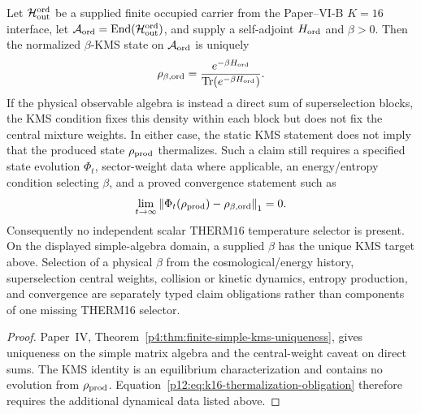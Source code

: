 \documentclass[12pt,a4paper]{article}
\begin{document}
\begin{corollary}
\label{p12:cor:k16-finite-kms-target-versus-thermalization}
Let \(\mathcal H_{\rm out}^{\rm ord}\) be a supplied finite occupied carrier
from the Paper--VI-B \(K=16\) interface, let
\(\mathcal A_{\rm ord}=\operatorname{End}(\mathcal H_{\rm out}^{\rm ord})\), and supply a
self-adjoint \(H_{\rm ord}\) and \(\beta>0\).  Then the normalized
\(\beta\)-KMS state on \(\mathcal A_{\rm ord}\) is uniquely
\begin{equation}
\label{p12:eq:k16-unique-finite-kms-target}
 \rho_{\beta,\rm ord}
 =\frac{e^{-\beta H_{\rm ord}}}
        {\operatorname{Tr}(e^{-\beta H_{\rm ord}})}.
\end{equation}
If the physical observable algebra is instead a direct sum of superselection
blocks, the KMS condition fixes this density within each block but does not
fix the central mixture weights.  In either case, the static KMS statement
does not imply that the produced state \(\rho_{\rm prod}\) thermalizes.  Such a
claim still requires a specified state evolution \(\Phi_t\), sector-weight
data where applicable, an energy/entropy condition selecting \(\beta\), and a
proved convergence statement such as
\begin{equation}
\label{p12:eq:k16-thermalization-obligation}
 \lim_{t\to\infty}
 \left\|\Phi_t(\rho_{\rm prod})-\rho_{\beta,\rm ord}\right\|_1=0.
\end{equation}
Consequently no independent scalar \(\mathrm{THERM16}\) temperature selector
is present.  On the displayed simple-algebra domain, a supplied \(\beta\) has
the unique KMS target above.  Selection of a physical \(\beta\) from the
cosmological/energy history, superselection central weights, collision or
kinetic dynamics, entropy production, and convergence are separately typed
claim obligations rather than components of one missing THERM16 selector.
\end{corollary}

\begin{proof}
Paper~IV, Theorem~\ref{p4:thm:finite-simple-kms-uniqueness}, gives uniqueness
on the simple matrix algebra and the central-weight caveat on direct sums.
The KMS identity is an equilibrium characterization and contains no evolution
from \(\rho_{\rm prod}\).  Equation~\eqref{p12:eq:k16-thermalization-obligation}
therefore requires the additional dynamical data listed above.
\end{proof}
\end{document}
